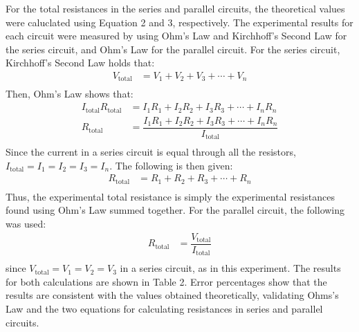 \documentclass [12pt, letterpaper, twoside] {article}
\begin{document}
For the total resistances in the series and parallel circuits, the theoretical values were caluclated using Equation 2 and 3, respectively. The experimental results for each circuit were measured by using Ohm's Law and Kirchhoff's Second Law for the series circuit, and Ohm's Law for the parallel circuit. For the series circuit, Kirchhoff's Second Law holds that:
\begin{equation}
  \begin{split}
    V_{\text{total}} &= V_{1} + V_{2} + V_{3} + \cdots + V_{n} \\
  \end{split}
\end{equation}
Then, Ohm's Law shows that:
\begin{equation}
  \begin{split}
    I_{\text{total}}R_{\text{total}} &= I_{1}R_{1} + I_{2}R_{2} + I_{3}R_{3} + \cdots + I_{n}R_{n} \\
    R_{\text{total}} &= \dfrac{I_{1}R_{1} + I_{2}R_{2} + I_{3}R_{3} + \cdots + I_{n}R_{n}}{I_{\text{total}}} \\
  \end{split}
\end{equation}
Since the current in a series circuit is equal through all the resistors, \(I_{\text{total}} = I_{1} = I_{2} = I_{3} = I_{n}\). The following is then given:
\begin{equation*}
  \begin{split}
    R_{\text{total}} &= R_{1} + R_{2} + R_{3} + \cdots + R_{n} \\
  \end{split}
\end{equation*}
Thus, the experimental total resistance is simply the experimental resistances found using Ohm's Law summed together. For the parallel circuit, the following was used:
\begin{equation*}
  \begin{split}
    R_{\text{total}} &= \dfrac{V_{\text{total}}}{I_{\text{total}}} \\
  \end{split}
\end{equation*}
since \(V_{\text{total}} = V_{1} = V_{2} = V_{3}\) in a series circuit, as in this experiment. The results for both calculations are shown in Table 2. Error percentages show that the results are consistent with the values obtained theoretically, validating Ohms's Law and the two equations for calculating resistances in series and parallel circuits.
\end{document}
